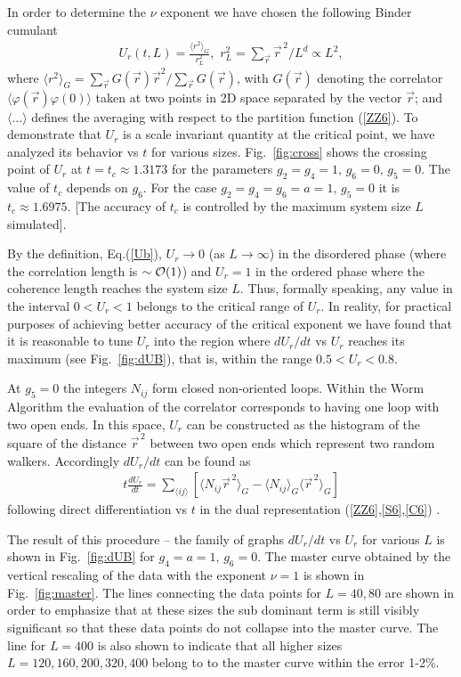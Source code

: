 \documentclass[prb,aps,twocolumn,groupedaddress,floats,showpacs,final]{revtex4}
\def\beq{\begin{eqnarray}}
\def\eeq{\end{eqnarray}}
\begin{document}
In order to determine the $\nu $ exponent we have chosen the following Binder cumulant
\beq
U_r(t,L)=\frac{\langle r^2\rangle_G }{r^2_L },\,\, r^2_L=\sum_{\vec{r}} \vec{r}^{\,2}/L^d \propto L^2,
\label{Ub}
\eeq
where $\langle r^2\rangle_G= \sum_{\vec{r}} G(\vec{r}) \vec{r}^2 /\sum_{\vec{r}} G(\vec{r})$, with  $G(\vec{r})$ denoting the correlator $\langle \varphi(\vec{r}) \varphi(0) \rangle$ taken at two points in 2D space separated by the vector $\vec{r}$; and $\langle ...\rangle $ defines the averaging with respect to the partition function (\ref{ZZ6}). 
To demonstrate that $U_r$ is a scale invariant quantity at the critical point, we have analyzed its behavior vs $t$ for various sizes. Fig.~\ref{fig:cross} shows the crossing point of $U_r$ at $t=t_c\approx 1.3173$ for the parameters $g_2=g_4=1,\, g_6=0,\, g_5=0$.  The value of $t_c$ depends on $g_6$. For the case $g_2=g_4=g_6=a=1,\, g_5=0$ it is $t_c \approx 1.6975$.
[The accuracy of $t_c$ is controlled by the maximum system size $L$ simulated].
  
By the definition, Eq.(\ref{Ub}),  $U_r\to 0$ (as $L\to \infty$) in the disordered phase (where the correlation length is $\sim {\cal O}(1)$) and $U_r=1$ in the ordered phase where the coherence length reaches the system size $L$. Thus, formally speaking, any value in the interval  $0< U_r<1$ belongs to the critical range of $U_r$.  In reality, for practical purposes of achieving better accuracy of the critical exponent we have found that it is reasonable to tune $U_r $ into the region where $dU_r/dt $ vs $U_r$ reaches its maximum (see  Fig.~\ref{fig:dUB}), that is, within the range $0.5 < U_r< 0.8$. 


  At $g_5=0$ the integers $N_{ij}$ form closed non-oriented loops. Within the Worm Algorithm \cite{WA} the evaluation of the correlator corresponds to having one loop with two open ends. In this space, $U_r$ can be constructed as the histogram of the square of the distance $\vec{r}^{\,2} $ between two  open ends which represent two random walkers. Accordingly $dU_r/dt$ can be found as 
\beq
t \frac{dU_r}{dt}= \sum_{\langle ij \rangle} [\langle  N_{ij}  \vec{r}^{\,2}\rangle_G -  \langle  N_{ij} \rangle_G \langle \vec{r}^{\,2}\rangle_G]
\label{dUb}
\eeq
 following direct differentiation vs $t$ in the dual representation (\ref{ZZ6},\ref{S6},\ref{C6}) .

The result of this procedure -- the family of graphs $dU_r/dt$ vs $U_r$ for various $L$ is shown in Fig.~\ref{fig:dUB} for $g_4=a=1,\, g_6=0$. 
The master curve obtained by the vertical rescaling of the data with the exponent $\nu=1$ is shown in Fig.~\ref{fig:master}.
The lines connecting the data points  for $L=40,80$ are shown in order to emphasize that at these sizes the sub dominant term is still visibly significant so that these data points do not collapse into the master curve. The line for $L=400$ is also shown to indicate that all higher sizes $L=120,160,200,320,400$ belong to to the master curve within the error 1-2\%.   
\end{document}
